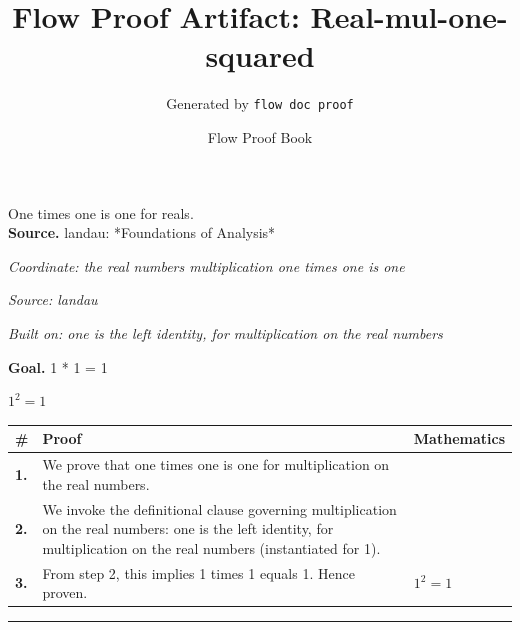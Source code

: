\documentclass[11pt]{article}
\title{Flow Proof Artifact: Real-mul-one-squared}
\author{Generated by \texttt{flow doc proof}}
\date{Flow Proof Book}
\theoremstyle{definition}
\begin{document}
\maketitle
One times one is one for reals.\\[0.5em]
\textbf{Source.} landau: *Foundations of Analysis*\\[0.5em]
\bigskip
{}\par
\smallskip\noindent\textit{Coordinate: the real numbers \cdot multiplication \cdot one times one is one}\par
\smallskip\noindent\textit{Source: landau}\par
\smallskip\noindent\textit{Built on: one is the left identity, for multiplication on the real numbers}\par
\medskip
\noindent\textbf{Goal.} 1 * 1 = 1\par
\noindent$\displaystyle 1^{2} = 1$\par
\medskip
\noindent
\begin{tabular}{@{} >{\raggedright\arraybackslash}p{} >{\raggedright\arraybackslash}p{} >{\raggedleft\arraybackslash}p{} @{}}
\textbf{\#} & \textbf{Proof} & \textbf{Mathematics} \\
\midrule
\textbf{1.} & We prove that one times one is one for multiplication on the real numbers. & \\[0.45em]
\textbf{2.} & We invoke the definitional clause governing multiplication on the real numbers: one is the left identity, for multiplication on the real numbers (instantiated for 1). & \\[0.45em]
\textbf{3.} & From step 2, this implies 1 times 1 equals 1. Hence proven. & $\displaystyle 1^{2} = 1$ \\[0.45em]
\bottomrule
\end{tabular}
\label{thm:Real-multiplication-one_times_one_is_one}
\par\medskip\hrule
\end{document}
